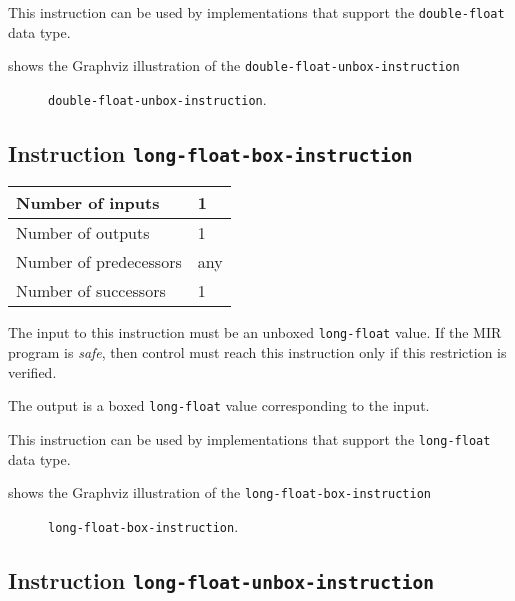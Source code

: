 This instruction can be used by implementations that support the
\texttt{double-float} data type.   

 shows the Graphviz illustration of the
\texttt{double-float-unbox-instruction}

\begin{figure}
\begin{center}
\end{center}
\caption{\label{fig-double-float-unbox-instruction}
\texttt{double-float-unbox-instruction}.}
\end{figure}

\subsection{Instruction \texttt{long-float-box-instruction}}
\label{mir-instruction-long-float-box}

\begin{tabular}{|l|l|}
\hline
Number of inputs & 1\\
\hline
Number of outputs & 1\\
\hline
Number of predecessors & any\\
\hline
Number of successors & 1\\
\hline
\end{tabular}

The input to this instruction must be an unboxed \texttt{long-float}
value.  If the MIR program is \emph{safe}, then control must reach
this instruction only if this restriction is verified.

The output is a boxed \texttt{long-float} value corresponding to the
input.

This instruction can be used by implementations that support the
\texttt{long-float} data type.   

 shows the Graphviz illustration of the
\texttt{long-float-box-instruction}

\begin{figure}
\begin{center}
\end{center}
\caption{\label{fig-long-float-box-instruction}
\texttt{long-float-box-instruction}.}
\end{figure}

\subsection{Instruction \texttt{long-float-unbox-instruction}}
\label{mir-instruction-long-float-unbox}

